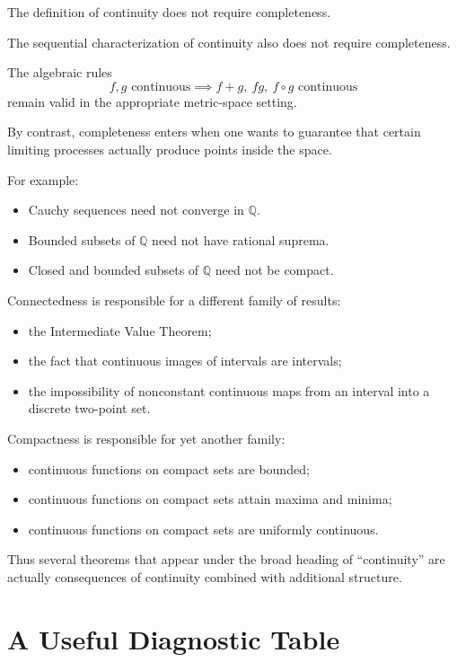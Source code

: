 \documentclass{essay}
\begin{document}
The definition of continuity does not require completeness.

The sequential characterization of continuity also does not require
completeness.

The algebraic rules
\[
f,g\text{ continuous}
\implies
f+g,\ fg,\ f\circ g\text{ continuous}
\]
remain valid in the appropriate metric-space setting.

By contrast, completeness enters when one wants to guarantee that certain
limiting processes actually produce points inside the space.

For example:
\begin{itemize}
    \item Cauchy sequences need not converge in \(\mathbb{Q}\).
    \item Bounded subsets of \(\mathbb{Q}\) need not have rational suprema.
    \item Closed and bounded subsets of \(\mathbb{Q}\) need not be compact.
\end{itemize}

Connectedness is responsible for a different family of results:
\begin{itemize}
    \item the Intermediate Value Theorem;
    \item the fact that continuous images of intervals are intervals;
    \item the impossibility of nonconstant continuous maps from an interval
    into a discrete two-point set.
\end{itemize}

Compactness is responsible for yet another family:
\begin{itemize}
    \item continuous functions on compact sets are bounded;
    \item continuous functions on compact sets attain maxima and minima;
    \item continuous functions on compact sets are uniformly continuous.
\end{itemize}

Thus several theorems that appear under the broad heading of ``continuity''
are actually consequences of continuity combined with additional structure.

\section{A Useful Diagnostic Table}
\end{document}
